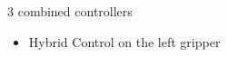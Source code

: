 \begin{frame}{3 combined controllers}
\begin{minipage}{0.25\textwidth}
  \end{minipage}
%
{\color{txtcolor2}\vrule}
  \begin{minipage}{0.40\textwidth}
    \vspace*{2ex}
    \begin{itemize}
    \item Hybrid Control on the left gripper
    \end{itemize}

\end{minipage}
\end{frame}
